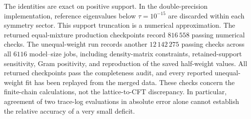 \documentclass[11pt]{article}
\begin{document}
The identities are exact on positive support. In the
double-precision implementation, reference eigenvalues below
$\tau=10^{-15}$ are discarded within each symmetry sector.
This support truncation is a numerical approximation. The returned
equal-mixture production checkpoints record $816\,558$ passing
numerical checks. The unequal-weight run records another
$12\,142\,275$ passing checks across all $6116$ model--size jobs,
including density-matrix constraints, retained-support sensitivity,
Gram positivity, and reproduction of the saved half-weight values.
All returned checkpoints pass the completeness audit, and every
reported unequal-weight fit has been replayed from the merged data.
These checks concern the finite-chain calculations, not the
lattice-to-CFT discrepancy. In particular, agreement of two
trace-log evaluations in absolute error alone cannot establish
the relative accuracy of a very small deficit.
\end{document}

